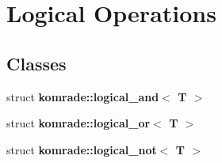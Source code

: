 \section{Logical Operations}
\label{group__logical__operations}
\subsection*{Classes}
\begin{CompactItemize}
\item 
struct {\bf komrade::logical\_\-and$<$ T $>$}
\item 
struct {\bf komrade::logical\_\-or$<$ T $>$}
\item 
struct {\bf komrade::logical\_\-not$<$ T $>$}
\end{CompactItemize}
